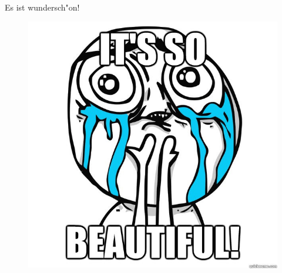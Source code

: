 \documentclass[18pt]{beamer}
\begin{document}
\begin{frame}[fragile]{Es ist wundersch"on!}
\begin{figure}
\includegraphics[height=0.8\textheight]{beautiful} 
\end{figure}
\end{frame}
\end{document}
